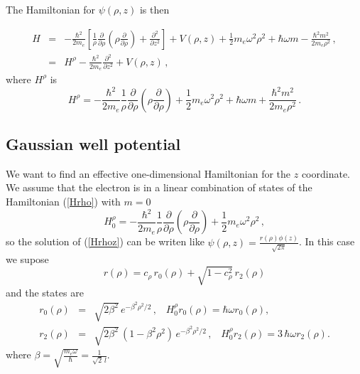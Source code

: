 \documentclass[a4paper,10pt]{article}
\begin{document}
The Hamiltonian for $\psi(\rho,z)$ is then

\begin{eqnarray}\label{Hrhoz}
H &=& -\frac{\hbar^2}{2 m_e}\left[\frac{1}{\rho}\frac{\partial}{\partial \rho}\left(\rho \frac{\partial}{\partial \rho} \right)
 + \frac{\partial^2}{\partial z^2} \right] + V(\rho, z) + \frac{1}{2} m_e \omega^2 \rho^2 + \hbar \omega m - \frac{\hbar^2 m^2}{2 m_e \rho^2}\,,\\
  &=& H^{\rho} - \frac{\hbar^2}{2 m_e}\frac{\partial^2}{\partial z^2} + V(\rho, z)\, ,
\end{eqnarray}
\noindent
where $H^{\rho}$ is
\begin{equation}\label{Hrho}
  H^{\rho} = -\frac{\hbar^2}{2 m_e} \frac{1}{\rho}\frac{\partial}{\partial \rho}\left(\rho \frac{\partial}{\partial \rho} \right) +
  \frac{1}{2} m_e \omega^2 \rho^2 + \hbar \omega m + \frac{\hbar^2 m^2}{2 m_e \rho^2}\,.
\end{equation}

\subsection*{Gaussian well potential}
We want to find an effective one-dimensional Hamiltonian for the $z$ coordinate. We assume that
the electron is in a linear combination of states of the Hamiltonian (\ref{Hrho}) with $m = 0$
\begin{equation}
  H_{0}^{\rho} = -\frac{\hbar^2}{2 m_e} \frac{1}{\rho}\frac{\partial}{\partial \rho}\left(\rho \frac{\partial}{\partial \rho} \right) +
  \frac{1}{2} m_e \omega^2 \rho^2 \, ,
\end{equation}
\noindent so the solution of (\ref{Hrhoz})
can be writen like $\psi(\rho, z) = \frac{r(\rho)\phi(z)}{\sqrt{2\pi}}$. In this case we supose
\begin{equation}
  r(\rho) = c_{\rho}\, r_0(\rho) + \sqrt{1 - c_{\rho}^2}\, r_2(\rho)
\end{equation}
\noindent and the states are
\begin{eqnarray}
  r_0(\rho) &=& \sqrt{2 \beta^2}\, e^{-\beta^2 \rho^2/2}\,,\,\,\,\,\,H_{0}^{\rho} r_0(\rho) = \hbar \omega r_0(\rho) ,\\
  r_2(\rho) &=& \sqrt{2 \beta^2}\, \left(1 - \beta^2 \rho^2 \right)\, e^{-\beta^2 \rho^2/2}\,,\,\,\,\,\,H_{0}^{\rho} r_2(\rho) = 3\,\hbar \omega r_2(\rho).
\end{eqnarray}
\noindent where $\beta = \sqrt{\frac{m_e \omega}{\hbar}} = \frac{1}{\sqrt{2}\,l}$.
\end{document}
